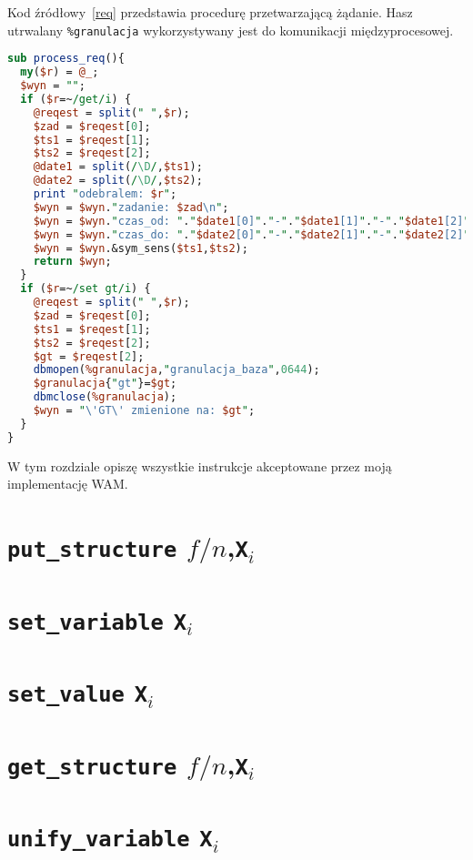 {\color{dgray}
Kod źródłowy~\ref{req} przedstawia procedurę przetwarzającą żądanie. Hasz utrwalany \verb|%granulacja| wykorzystywany jest do komunikacji międzyprocesowej.
}

\begin{small}
\begin{lstlisting}[language=perl, frame=lines, caption=Przetwarzanie żądania - procedura \texttt{process\_req()}\label{req}., firstnumber=86]
sub process_req(){	
  my($r) = @_;
  $wyn = "";
  if ($r=~/get/i) {
	@reqest = split(" ",$r);
	$zad = $reqest[0];
	$ts1 = $reqest[1];
	$ts2 = $reqest[2];
	@date1 = split(/\D/,$ts1);
	@date2 = split(/\D/,$ts2);
	print "odebralem: $r"; 
	$wyn = $wyn."zadanie: $zad\n";
	$wyn = $wyn."czas_od: "."$date1[0]"."-"."$date1[1]"."-"."$date1[2]"."_"."$date1[3]".":"."$date1[4]".":"."$date1[5]"."\n";
	$wyn = $wyn."czas_do: "."$date2[0]"."-"."$date2[1]"."-"."$date2[2]"."_"."$date2[3]".":"."$date2[4]".":"."$date2[5]"."\n";		
	$wyn = $wyn.&sym_sens($ts1,$ts2);
	return $wyn;
  }
  if ($r=~/set gt/i) {
	@reqest = split(" ",$r);
	$zad = $reqest[0];
	$ts1 = $reqest[1];
	$ts2 = $reqest[2];
	$gt = $reqest[2];
	dbmopen(%granulacja,"granulacja_baza",0644);
	$granulacja{"gt"}=$gt;
	dbmclose(%granulacja);
	$wyn = "\'GT\' zmienione na: $gt";
  }		
}	
\end{lstlisting} 
\end{small}
\fi

W tym rozdziale opiszę wszystkie instrukcje akceptowane przez moją implementację WAM.

\section{\texttt{put\_structure} $f/n$,\texttt{X}$_i$}

\section{\texttt{set\_variable} \texttt{X}$_i$}

\section{\texttt{set\_value} \texttt{X}$_i$}

\section{\texttt{get\_structure} $f/n$,\texttt{X}$_i$}

\section{\texttt{unify\_variable} \texttt{X}$_i$}

